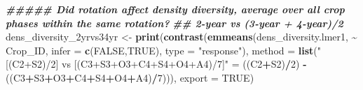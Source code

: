 \documentclass[
]{article}
\newenvironment{Shaded}{\begin{snugshade}}{\end{snugshade}}
\newcommand{\AttributeTok}[1]{\textcolor[rgb]{0.13,0.29,0.53}{#1}}
\newcommand{\ConstantTok}[1]{\textcolor[rgb]{0.56,0.35,0.01}{#1}}
\newcommand{\DecValTok}[1]{\textcolor[rgb]{0.00,0.00,0.81}{#1}}
\newcommand{\DocumentationTok}[1]{\textcolor[rgb]{0.56,0.35,0.01}{\textbf{\textit{#1}}}}
\newcommand{\FunctionTok}[1]{\textcolor[rgb]{0.13,0.29,0.53}{\textbf{#1}}}
\newcommand{\NormalTok}[1]{#1}
\newcommand{\OtherTok}[1]{\textcolor[rgb]{0.56,0.35,0.01}{#1}}
\newcommand{\SpecialCharTok}[1]{\textcolor[rgb]{0.81,0.36,0.00}{\textbf{#1}}}
\newcommand{\StringTok}[1]{\textcolor[rgb]{0.31,0.60,0.02}{#1}}
\begin{document}
\begin{Shaded}
\begin{Highlighting}[]
\DocumentationTok{\#\#\#\#\# Did rotation affect density diversity, average over all crop phases within the same rotation?}
\DocumentationTok{\#\# 2{-}year vs (3{-}year + 4{-}year)/2}
\NormalTok{dens\_diversity\_2yrvs34yr }\OtherTok{\textless{}{-}} \FunctionTok{print}\NormalTok{(}\FunctionTok{contrast}\NormalTok{(}\FunctionTok{emmeans}\NormalTok{(dens\_diversity.lmer1, }\SpecialCharTok{\textasciitilde{}}\NormalTok{ Crop\_ID,}
                                                   \AttributeTok{infer =} \FunctionTok{c}\NormalTok{(}\ConstantTok{FALSE}\NormalTok{,}\ConstantTok{TRUE}\NormalTok{), }
                                                   \AttributeTok{type =} \StringTok{"response"}\NormalTok{),}
                                           \AttributeTok{method =} \FunctionTok{list}\NormalTok{(}\StringTok{"[(C2+S2)/2] vs [(C3+S3+O3+C4+S4+O4+A4)/7]"} \OtherTok{=} 
\NormalTok{                                                           ((C2}\SpecialCharTok{+}\NormalTok{S2)}\SpecialCharTok{/}\DecValTok{2}\NormalTok{) }\SpecialCharTok{{-}}\NormalTok{ ((C3}\SpecialCharTok{+}\NormalTok{S3}\SpecialCharTok{+}\NormalTok{O3}\SpecialCharTok{+}\NormalTok{C4}\SpecialCharTok{+}\NormalTok{S4}\SpecialCharTok{+}\NormalTok{O4}\SpecialCharTok{+}\NormalTok{A4)}\SpecialCharTok{/}\DecValTok{7}\NormalTok{))),}
                                  \AttributeTok{export =} \ConstantTok{TRUE}\NormalTok{)}


\end{Highlighting}
\end{Shaded}
\end{document}
